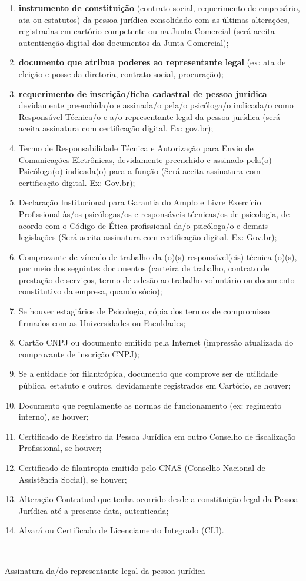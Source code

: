 \documentclass[openright, oneside, a4paper, article, brazil]{abntex2}
\begin{document}
\begin{enumerate}
    \item \textbf{instrumento de constituição}	(contrato social, requerimento de empresário, ata ou estatutos)
    da pessoa jurídica consolidado com as últimas alterações, regis­tradas em cartório competente ou na
    Junta Comercial (será aceita autenticação digital dos documen­tos da Junta Comercial);
    \item \textbf{documento que atribua poderes ao representante legal} (ex: ata de eleição e posse da
    diretoria, contrato social, procuração);
    \item \textbf{requerimento de inscrição/ficha cadastral de pessoa jurídica} devidamente preenchida/o
    e assinada/o pela/o psicóloga/o indicada/o como Responsável Técnica/o e a/o representante legal
    da pessoa jurídica (será aceita assinatura com certificação digital. Ex: gov.br);
    \item Termo de Responsabilidade Técnica e Autorização para Envio de Comunicações Eletrônicas,
    devidamente preenchido e assinado pela(o) Psicóloga(o) indicada(o) para a função (Será aceita assinatura
    com certificação digital. Ex: Gov.br);
    \item Declaração Institucional para Garantia do Amplo e Livre Exercício Profissional às/os
    psicólogas/os e responsáveis técnicas/os de psicologia, de acordo com o Código de Ética profissional
    da/o psicóloga/o e demais legislações (Será aceita assinatura com certificação digital. Ex: Gov.br);
    \item Comprovante de vínculo de trabalho da (o)(s) responsável(eis) técnica (o)(s), por meio dos seguintes
    documentos (carteira de trabalho, contrato de prestação de serviços, termo de adesão ao trabalho voluntário
    ou documento constitutivo da empresa, quando sócio);
    \item Se houver estagiários de Psicologia, cópia dos termos de compromisso firmados com as Universida­des ou Faculdades;
    \item Cartão CNPJ ou documento emitido pela Internet (impressão atualizada do comprovante de inscrição CNPJ);
    \item Se a entidade for filantrópica, documento que comprove ser de utilidade públi­ca, estatuto e outros,
    devidamente registrados em Cartório, se houver;
    \item Documento que regulamente as normas de funcionamento (ex: regimento interno), se houver;
    \item Certificado de Registro da Pessoa Jurídica em outro Conselho de fiscalização Profissional, se houver;
    \item Certificado de filantropia emitido pelo CNAS (Conselho Nacional de Assistência Social), se houver;
    \item Alteração Contratual que tenha ocorrido desde a constituição legal da Pessoa Jurídica até a presente
    data, autenticada;
    \item Alvará ou Certificado de Licenciamento Integrado (CLI).
\end{enumerate}
\vspace{4\baselineskip}

\centering
{}
\vspace{3\baselineskip}

\centering
\rule{24em}{0.4pt}\\
\small Assinatura da/do representante legal da pessoa jurídica
\vfill{}
\end{document}
